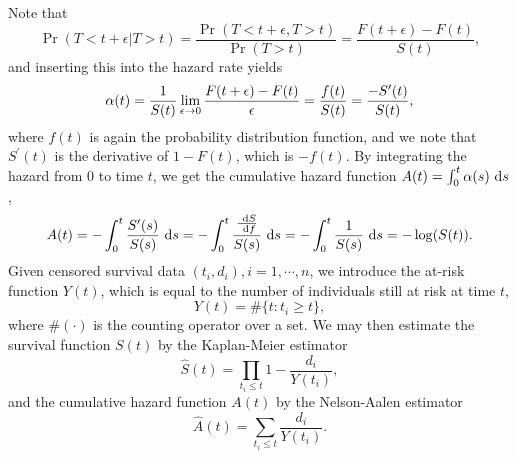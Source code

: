 Note that
\begin{equation*}
    \Pr(T<t+\epsilon|T>t)=\frac{\Pr(T<t+\epsilon,T>t)}{\Pr(T>t)}=\frac{F(t+\epsilon)-F(t)}{S(t)},
\end{equation*}
and inserting this into the hazard rate yields
\begin{equation}
\label{eq:hfs}
    \alpha(t)=\frac{1}{S(t)}\lim_{\epsilon\to0}\frac{F(t+\epsilon)-F(t)}{\epsilon}=\frac{f(t)}{S(t)}=\frac{-S^\prime(t)}{S(t)},
\end{equation}
where $f(t)$ is again the probability distribution function, and we note that $S^\prime(t)$ is the derivative of $1-F(t)$, which is $-f(t)$. By integrating the hazard from 0 to time $t$, we get the cumulative hazard function $A(t)=\int_0^t\alpha(s)~\text{d} s$,
\begin{equation*}
    A(t)=-\int_0^t\frac{S^\prime(s)}{S(s)}~\text{d} s=-\int_0^t\frac{\frac{~\text{d} S}{~\text{d} f}}{S(s)}~\text{d} s=-\int_0^t\frac{1}{S(s)}~\text{d} s=-\log(S(t)).
\end{equation*}
Given censored survival data $(t_i,d_i),i=1,\cdots,n$, we introduce the at-risk function $Y(t)$, which is equal to the number of individuals still at risk at time $t$,
\begin{equation*}
    Y(t)=\#\{t\colon t_i\geq t\},
\end{equation*}
where $\#(\cdot)$ is the counting operator over a set. We may then estimate the survival function $S(t)$ by the Kaplan-Meier estimator
\begin{equation*}
    \hat{S}(t)=\prod_{t_i\leq t}1-\frac{d_i}{Y(t_i)},
\end{equation*}
and the cumulative hazard function $A(t)$ by the Nelson-Aalen estimator
\begin{equation*}
    \hat{A}(t)=\sum_{t_i\leq t}\frac{d_i}{Y(t_i)}.
\end{equation*}

